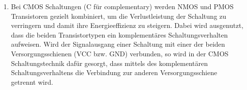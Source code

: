 \documentclass[a4paper]{article}
\begin{document}
\begin{enumerate}[label=\alph*)]
\begin{figure}[h!]
\begin{center}
		\end{center}
	\end{figure} 
	\item Bei CMOS Schaltungen (C für complementary) werden NMOS und PMOS Transistoren gezielt kombiniert, um die Verlustleistung der Schaltung zu verringern und damit ihre Energieeffizienz zu steigern. Dabei wird ausgenutzt, dass die beiden Transistortypen ein komplementäres Schaltungsverhalten aufweisen. Wird der Signalausgang einer Schaltung mit einer der beiden Versorgungsschienen (VCC bzw. GND) verbunden, so wird in der CMOS Schaltungstechnik dafür gesorgt, dass mittels des komplementären Schaltungsverhaltens die Verbindung zur anderen Versorgungsschiene getrennt wird. 
\end{enumerate}
\end{document}
